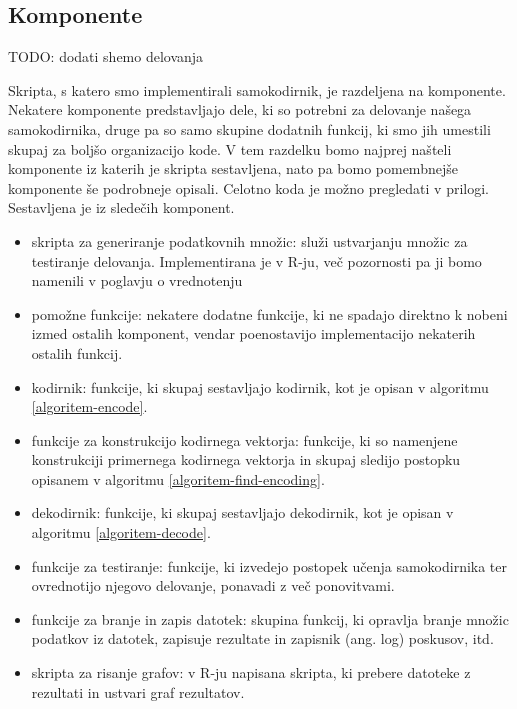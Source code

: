 \documentclass[12pt,a4paper]{article}
\begin{document}
\subsection{Komponente}

TODO: dodati shemo delovanja

Skripta, s katero smo implementirali samokodirnik, je razdeljena na komponente.
Nekatere komponente predstavljajo dele, ki so potrebni za delovanje našega samokodirnika, 
druge pa so samo skupine dodatnih funkcij, ki smo jih umestili skupaj za boljšo organizacijo kode.
V tem razdelku bomo najprej našteli komponente iz katerih je skripta sestavljena, nato pa bomo pomembnejše komponente še podrobneje opisali.
Celotno koda je možno pregledati v prilogi. Sestavljena je iz sledečih komponent.

\begin{itemize}
	\item skripta za generiranje podatkovnih množic: služi ustvarjanju množic za testiranje delovanja. 
	Implementirana je v R-ju, več pozornosti pa ji bomo namenili v poglavju o vrednotenju %
	
	\item pomožne funkcije: nekatere dodatne funkcije, ki ne spadajo direktno k nobeni izmed ostalih komponent, 
	vendar poenostavijo implementacijo nekaterih ostalih funkcij.

	\item kodirnik: funkcije, ki skupaj sestavljajo kodirnik, kot je opisan v algoritmu \ref{algoritem-encode}.

	\item funkcije za konstrukcijo kodirnega vektorja: 
	funkcije, ki so namenjene konstrukciji primernega kodirnega vektorja in skupaj sledijo postopku opisanem v algoritmu \ref{algoritem-find-encoding}.

	\item dekodirnik: funkcije, ki skupaj sestavljajo dekodirnik, kot je opisan v algoritmu \ref{algoritem-decode}.

	\item funkcije za testiranje: funkcije, ki izvedejo postopek učenja samokodirnika ter ovrednotijo njegovo delovanje, ponavadi z več ponovitvami.

	\item funkcije za branje in zapis datotek: skupina funkcij, ki opravlja branje množic podatkov iz datotek, zapisuje rezultate in zapisnik (ang. log) poskusov, itd. %

	\item skripta za risanje grafov: v R-ju napisana skripta, ki prebere datoteke z rezultati in ustvari graf rezultatov.
\end{itemize}
\end{document}
